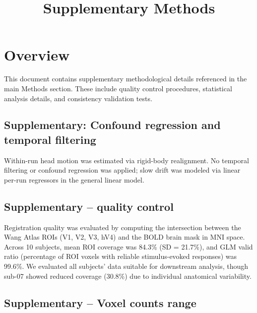 \documentclass[a4paper,11pt]{article}
\title{Supplementary Methods}
\author{}
\date{}
\begin{document}
\maketitle

\section*{Overview}

This document contains supplementary methodological details referenced in the main Methods section. These include quality control procedures, statistical analysis details, and consistency validation tests.



\subsection*{Supplementary: Confound regression and temporal filtering}

Within-run head motion was estimated via rigid-body realignment. No temporal filtering or confound regression was applied; slow drift was modeled via linear per-run regressors in the general linear model.




\subsection*{Supplementary -- quality control}

Registration quality was evaluated by computing the intersection between the Wang Atlas ROIs (V1, V2, V3, hV4) and the BOLD brain mask in MNI space. Across 10 subjects, mean ROI coverage was 84.3\% (SD = 21.7\%), and GLM valid ratio (percentage of ROI voxels with reliable stimulus-evoked responses) was 99.6\%. We evaluated all subjects' data suitable for downstream analysis, though sub-07 showed reduced coverage (30.8\%) due to individual anatomical variability.




\subsection*{Supplementary -- Voxel counts range}
\end{document}
